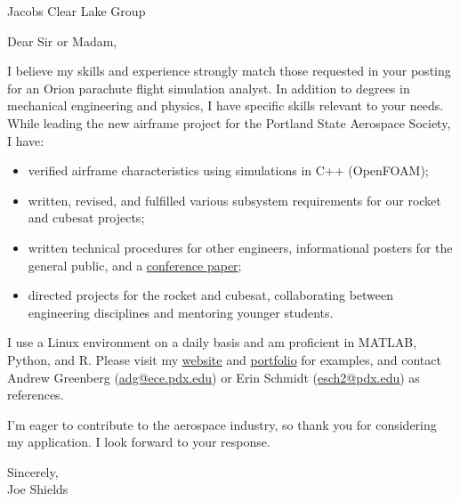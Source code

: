 \documentclass[letterpaper]{letter}
\begin{document}
\large

\begin{letter}{Jacobs Clear Lake Group}
\opening{Dear Sir or Madam,}

I believe my skills and experience strongly match those requested in your posting for an Orion parachute flight simulation analyst. 
In addition to degrees in mechanical engineering and physics, I have specific skills relevant to your needs.
While leading the new airframe project for the Portland State Aerospace Society, I have: 
\begin{itemize}
	\item verified airframe characteristics using simulations in C++ (OpenFOAM);
	\item written, revised, and fulfilled various subsystem requirements for our rocket and cubesat projects;
	\item written technical procedures for other engineers, informational posters for the general public, and a \href{http://arc.aiaa.org/doi/pdf/10.2514/6.2016-5365}{conference paper};
	\item directed projects for the rocket and cubesat, collaborating between engineering disciplines and mentoring younger students.
\end{itemize}
I use a Linux environment on a daily basis and am proficient in MATLAB, Python, and R.
Please visit my \href{http://joedang.github.io}{website} and \href{http://github.com/Joedang/Portfolio}{portfolio} for examples,
and contact Andrew Greenberg (\href{mailto:adg@ece.pdx.edu}{adg@ece.pdx.edu}) or Erin Schmidt (\href{mailto:esch2@pdx.edu}{esch2@pdx.edu}) as references. 

I'm eager to contribute to the aerospace industry, so thank you for considering my application. I look forward to your response. 

\closing{Sincerely,\\ Joe Shields}
\end{letter}
\end{document}
